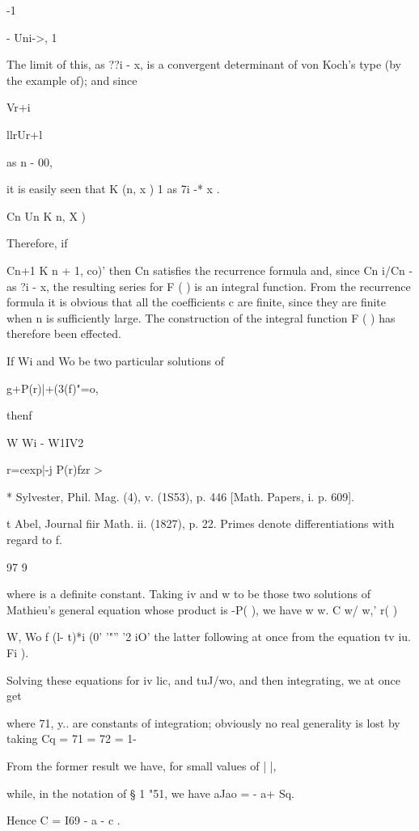 -1

- Uni->, 1

The limit of this, as ??i - x, is a convergent determinant of von
Koch's type (by the example of); and since

Vr+i

llrUr+l

as n - 00,

it is easily seen that K (n, x ) 1 as 7i -* x .

Cn Un K n, X )

Therefore, if

Cn+1 K n + 1, co)' then Cn satisfies the recurrence formula and, since
Cn i/Cn - as ?i - x, the resulting series for F ( ) is an integral
function. From the recurrence formula it is obvious that all the
coefficients c are finite, since they are finite when n is
sufficiently large. The construction of the integral function F ( )
has therefore been effected.

If Wi and
Wo be two particular solutions of

g+P(r)|+(3(f)"=o,

thenf

W Wi - W1IV2

r=cexp|-j P(r)fzr >

* Sylvester, Phil. Mag. (4), v. (1S53), p. 446 [Math. Papers, i. p.
609].

t Abel, Journal fiir Math. ii. (1827), p. 22. Primes denote
differentiations with regard to f.

97 9

%
%

where is a definite constant. Taking iv and w to be those two
solutions of Mathieu's general equation whose product is -P( ), we
have w w. C w/ w,' r( )

W, Wo f (l- t)*i (0' '"'' '2 iO' the latter following at once from the
equation tv iu. Fi ).

Solving these equations for iv lic, and tuJ/wo, and then integrating,
we at once get

where 71, y.. are constants of integration; obviously no real
generality is lost by taking Cq = 71 = 72 = 1-

From the former result we have, for small values of | |,

while, in the notation of § 1 "51, we have aJao = - a+ Sq.

Hence C = I69 - a - c .

